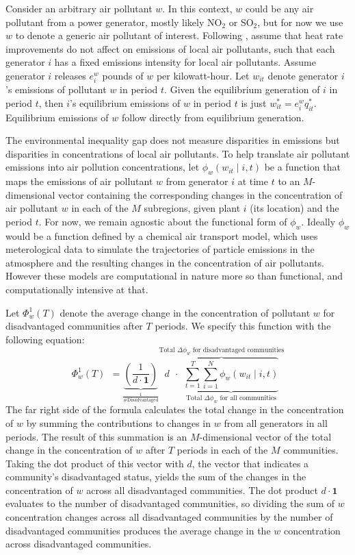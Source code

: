 Consider an arbitrary air pollutant $w$. In this context, $w$ could be any air pollutant from a power generator, mostly likely NO$_2$ or SO$_2$, but for now we use $w$ to denote a generic air pollutant of interest. Following \cite{weber2021dynamic}, assume that heat rate improvements do not affect on emissions of local air pollutants, such that each generator $i$ has a fixed emissions intensity for local air pollutants. Assume generator $i$ releases $e_i^w$ pounds of $w$ per kilowatt-hour. Let $w_{it}$ denote generator $i$'s emissions of pollutant $w$ in period $t$. Given the equilibrium generation of $i$ in period $t$, then $i$'s equilibrium emissions of $w$ in period $t$ is just $w_{it}^* = e_i^w q_{it}^*$. Equilibrium emissions of $w$ follow directly from equilibrium generation. 

The environmental inequality gap does not measure disparities in emissions but disparities in concentrations of local air pollutants. To help translate air pollutant emissions into air pollution concentrations, let $\phi_w (w_{it}\mid i, t)$ be a function that maps the emissions of air pollutant $w$ from generator $i$ at time $t$ to an $M$-dimensional vector containing the corresponding changes in the concentration of air pollutant $w$ in each of the $M$ subregions, given plant $i$ (its location) and the period $t$. For now, we remain agnostic about the functional form of $\phi_w$. Ideally $\phi_w$ would be a function defined by a chemical air transport model, which uses meterological data to simulate the trajectories of particle emissions in the atmosphere and the resulting changes in the concentration of air pollutants. However these models are computational in nature more so than functional, and computationally intensive at that. 

Let $\Phi_w^1(T)$ denote the average change in the concentration of pollutant $w$ for disadvantaged communities after $T$ periods. We specify this function with the following equation:
    \begin{equation} \label{Phi_w_1}
        \Phi_w^1(T) ~~ = \underbrace{\left(\frac{1}{d \cdot \textbf{1}}\right)}_{\frac{1}{\text{\# Disadvantaged}}} \overbrace{d ~~ \cdot ~~\underbrace{\sum_{t = 1}^T \sum_{i=1}^N \phi_w(w_{it}\mid i, t)}_{\text{Total $\Delta \phi_w$ for all communities}}}^\text{Total $\Delta \phi_w$ for disadvantaged communities}
    \end{equation} 
The far right side of the formula calculates the total change in the concentration of $w$ by summing the contributions to changes in $w$ from all generators in all periods. The result of this summation is an $M$-dimensional vector of the total change in the concentration of $w$ after $T$ periods in each of the $M$ communities. Taking the dot product of this vector with $d$, the vector that indicates a community's disadvantaged status, yields the sum of the changes in the concentration of $w$ across all disadvantaged communities. The dot product $d \cdot \textbf{1}$ evaluates to the number of disadvantaged communities, so dividing the sum of $w$ concentration changes across all disadvantaged communities by the number of disadvantaged communities produces the average change in the $w$ concentration across disadvantaged communities. 


